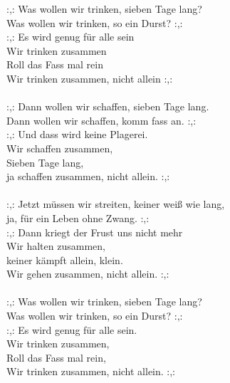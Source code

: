 
            :,: Was wollen wir trinken, sieben Tage lang? \\
            Was wollen wir trinken, so ein Durst? :,: \\
            :,: Es wird genug für alle sein  \\
            Wir trinken zusammen \\
            Roll das Fass mal rein \\
            Wir trinken zusammen, nicht allein :,: \\
\hspace{10mm} \\
            :,: Dann wollen wir schaffen, sieben Tage lang. \\
            Dann wollen wir schaffen, komm fass an. :,: \\
            :,: Und dass wird keine Plagerei.  \\
            Wir schaffen zusammen, \\
            Sieben Tage lang, \\
            ja schaffen zusammen, nicht allein. :,: \\
\hspace{10mm} \\
            :,: Jetzt müssen wir streiten, keiner weiß wie lang, \\
            ja, für ein Leben ohne Zwang. :,: \\
            :,: Dann kriegt der Frust uns nicht mehr  \\
            Wir halten zusammen,  \\
            keiner kämpft allein, klein. \\
            Wir gehen zusammen, nicht allein. :,: \\
\hspace{10mm} \\
            :,: Was wollen wir trinken, sieben Tage lang? \\
            Was wollen wir trinken, so ein Durst? :,: \\
            :,: Es wird genug für alle sein. \\
            Wir trinken zusammen, \\
            Roll das Fass mal rein, \\
            Wir trinken zusammen, nicht allein. :,: \\
